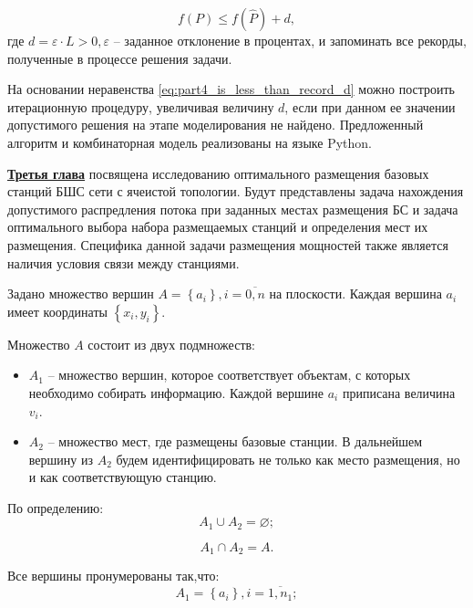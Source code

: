 \begin{equation}
    \label{eq:part4_is_less_than_record_d}
    f(P) \leqslant f(\widehat{P}) + d,
\end{equation}
где $d = \varepsilon \cdot L > 0, \varepsilon$ -- заданное отклонение в процентах, и запоминать все рекорды, полученные в процессе решения задачи.

На основании неравенства \cref{eq:part4_is_less_than_record_d} можно построить итерационную процедуру, увеличивая величину $d$, если при данном ее значении допустимого решения на этапе моделирования не найдено. Предложенный алгоритм и комбинаторная модель реализованы на языке Python.


\underline{\textbf{Третья глава}} посвящена исследованию оптимального размещения базовых станций БШС сети с ячеистой топологии. Будут представлены задача нахождения допустимого распредления потока при заданных местах размещения БС и задача оптимального выбора набора размещаемых стан­ций и определения мест их размещения. Специфика данной задачи размещения мощностей также является наличия условия связи между станциями.

Задано множество вершин $A= \left\{ a_i \right\}, i=\overline{0,n}$ на плоскости. Каждая вершина $a_i$ имеет координаты $\left\{ x_i, y_i \right\}$.

Множество $A$ состоит из двух подмножеств:
\begin{itemize}
    \item $A_1$ -- множество вершин, которое соответствует объектам, с которых необходимо собирать информацию. Каждой вершине $a_i$ приписана величина $v_i$.
    \item $A_2$ -- множество мест, где размещены базовые станции. В дальнейшем вершину из $A_2$ будем идентифицировать  не только как место размещения, но и как соответствующую станцию.
\end{itemize}

По определению:
$$
A_1 \cup A_2 = \varnothing;
$$

$$
A_1 \cap A_2 = A.
$$

Все вершины пронумерованы так,что:
$$
A_1 = \left\{a_i \right\}, i= \overline{1,n_1};
$$

